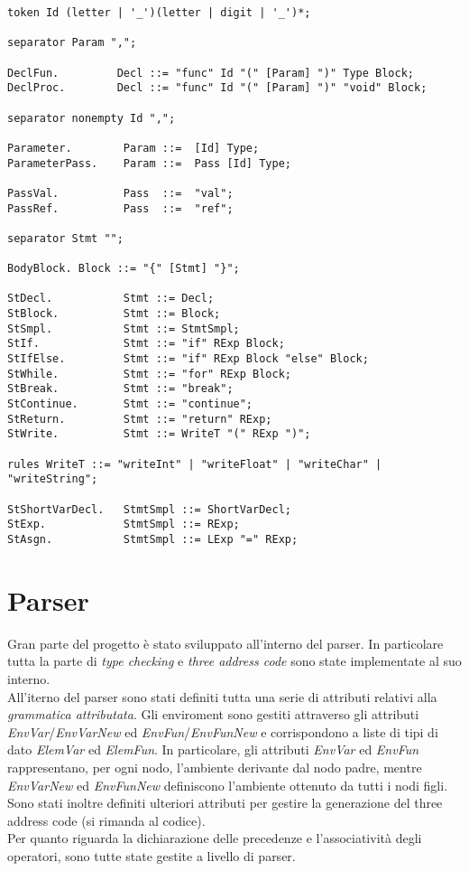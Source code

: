 \documentclass[12pt]{article}
\begin{document}
\begin{verbatim}
token Id (letter | '_')(letter | digit | '_')*;

separator Param ",";

DeclFun.         Decl ::= "func" Id "(" [Param] ")" Type Block;
DeclProc.        Decl ::= "func" Id "(" [Param] ")" "void" Block;

separator nonempty Id ",";

Parameter.        Param ::=  [Id] Type;
ParameterPass.    Param ::=  Pass [Id] Type;

PassVal.          Pass  ::=  "val";
PassRef.          Pass  ::=  "ref";

separator Stmt "";

BodyBlock. Block ::= "{" [Stmt] "}";

StDecl.           Stmt ::= Decl;
StBlock.          Stmt ::= Block;
StSmpl.           Stmt ::= StmtSmpl;
StIf.             Stmt ::= "if" RExp Block;
StIfElse.         Stmt ::= "if" RExp Block "else" Block;
StWhile.          Stmt ::= "for" RExp Block;
StBreak.          Stmt ::= "break"; 
StContinue.       Stmt ::= "continue";
StReturn.         Stmt ::= "return" RExp;
StWrite.          Stmt ::= WriteT "(" RExp ")";

rules WriteT ::= "writeInt" | "writeFloat" | "writeChar" | "writeString";

StShortVarDecl.   StmtSmpl ::= ShortVarDecl;
StExp.            StmtSmpl ::= RExp;
StAsgn.           StmtSmpl ::= LExp "=" RExp;
\end{verbatim}

\section{Parser}
Gran parte del progetto è stato sviluppato all'interno del parser. In particolare tutta la parte di \textit{type checking} e \textit{three address code} sono state implementate al suo interno.\\
All'iterno del parser sono stati definiti tutta una serie di attributi relativi alla \textit{grammatica attributata}.
Gli enviroment sono gestiti attraverso gli attributi \textit{EnvVar}/\textit{EnvVarNew} ed \textit{EnvFun}/\textit{EnvFunNew} e corrispondono a liste di tipi di dato \textit{ElemVar} ed \textit{ElemFun}. In particolare, gli attributi \textit{EnvVar} ed \textit{EnvFun} rappresentano, per ogni nodo, l'ambiente  derivante dal nodo padre, mentre \textit{EnvVarNew} ed \textit{EnvFunNew} definiscono l'ambiente ottenuto da tutti i nodi figli.
Sono stati inoltre definiti ulteriori attributi per gestire la generazione del three address code (si rimanda al codice).\\
Per quanto riguarda la dichiarazione delle precedenze e l'associatività degli operatori, sono tutte state gestite a livello di parser.
\end{document}
